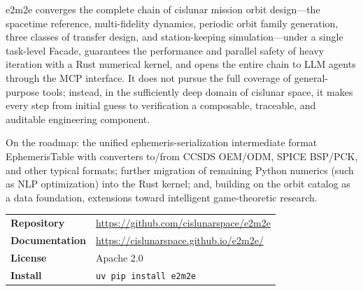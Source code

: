 e2m2e converges the complete chain of cislunar mission orbit design---the
spacetime reference, multi-fidelity dynamics, periodic orbit family
generation, three classes of transfer design, and station-keeping
simulation---under a single task-level Facade, guarantees the performance and
parallel safety of heavy iteration with a Rust numerical kernel, and opens
the entire chain to LLM agents through the MCP interface. It does not pursue
the full coverage of general-purpose tools; instead, in the sufficiently deep
domain of cislunar space, it makes every step from initial guess to
verification a composable, traceable, and auditable engineering component.

On the roadmap: the unified ephemeris-serialization intermediate format
EphemerisTable with converters to/from CCSDS OEM/ODM, SPICE BSP/PCK, and
other typical formats; further migration of remaining Python numerics (such
as NLP optimization) into the Rust kernel; and, building on the orbit catalog
as a data foundation, extensions toward intelligent game-theoretic research.

\begin{center}
\small
\begin{tabular}{@{}ll@{}}
\toprule
\textbf{Repository} & \url{https://github.com/cislunarspace/e2m2e} \\
\textbf{Documentation} & \url{https://cislunarspace.github.io/e2m2e/} \\
\textbf{License} & Apache 2.0 \\
\textbf{Install} & \texttt{uv pip install e2m2e} \\
\bottomrule
\end{tabular}
\end{center}
